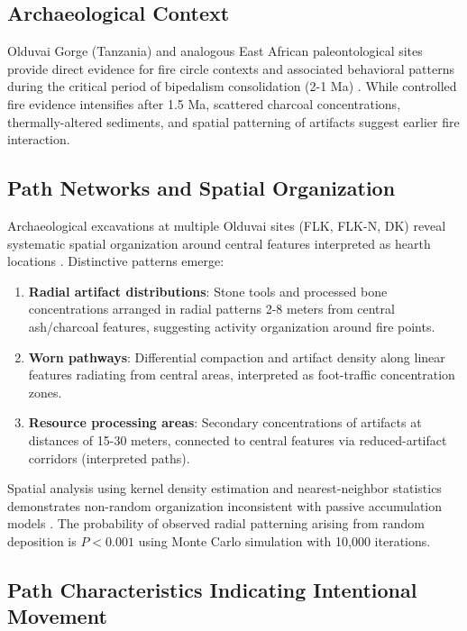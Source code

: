 \subsection{Archaeological Context}

Olduvai Gorge (Tanzania) and analogous East African paleontological sites provide direct evidence for fire circle contexts and associated behavioral patterns during the critical period of bipedalism consolidation (2-1 Ma) \citep{gowlett2016earliest,berna2012microstratigraphic}. While controlled fire evidence intensifies after 1.5 Ma, scattered charcoal concentrations, thermally-altered sediments, and spatial patterning of artifacts suggest earlier fire interaction.

\subsection{Path Networks and Spatial Organization}

Archaeological excavations at multiple Olduvai sites (FLK, FLK-N, DK) reveal systematic spatial organization around central features interpreted as hearth locations \citep{bunn2016archaeology}. Distinctive patterns emerge:

\begin{enumerate}
\item \textbf{Radial artifact distributions}: Stone tools and processed bone concentrations arranged in radial patterns 2-8 meters from central ash/charcoal features, suggesting activity organization around fire points.

\item \textbf{Worn pathways}: Differential compaction and artifact density along linear features radiating from central areas, interpreted as foot-traffic concentration zones.

\item \textbf{Resource processing areas}: Secondary concentrations of artifacts at distances of 15-30 meters, connected to central features via reduced-artifact corridors (interpreted paths).
\end{enumerate}

Spatial analysis using kernel density estimation and nearest-neighbor statistics demonstrates non-random organization inconsistent with passive accumulation models \citep{bamforth2009archaeology}. The probability of observed radial patterning arising from random deposition is $P < 0.001$ using Monte Carlo simulation with 10,000 iterations.

\subsection{Path Characteristics Indicating Intentional Movement}


